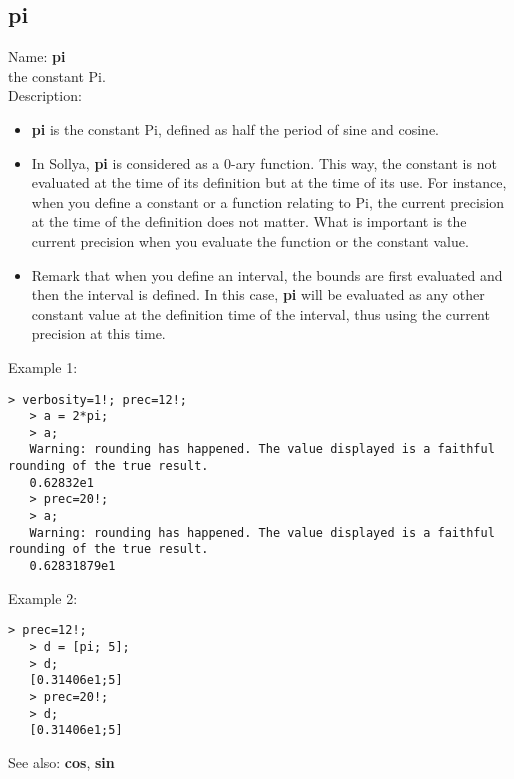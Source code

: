 \subsection{ pi }
\noindent Name: \textbf{pi}\\
the constant Pi.\\

\noindent Description: \begin{itemize}

\item \textbf{pi} is the constant Pi, defined as half the period of sine and cosine.

\item In Sollya, \textbf{pi} is considered as a 0-ary function. This way, the constant 
   is not evaluated at the time of its definition but at the time of its use. For 
   instance, when you define a constant or a function relating to Pi, the current
   precision at the time of the definition does not matter. What is important is 
   the current precision when you evaluate the function or the constant value.

\item Remark that when you define an interval, the bounds are first evaluated and 
   then the interval is defined. In this case, \textbf{pi} will be evaluated as any 
   other constant value at the definition time of the interval, thus using the 
   current precision at this time.
\end{itemize}
\noindent Example 1: 
\begin{center}\begin{minipage}{14.8cm}\begin{Verbatim}[frame=single]
   > verbosity=1!; prec=12!;
   > a = 2*pi;
   > a;
   Warning: rounding has happened. The value displayed is a faithful rounding of the true result.
   0.62832e1
   > prec=20!;
   > a;
   Warning: rounding has happened. The value displayed is a faithful rounding of the true result.
   0.62831879e1
\end{Verbatim}
\end{minipage}\end{center}
\noindent Example 2: 
\begin{center}\begin{minipage}{14.8cm}\begin{Verbatim}[frame=single]
   > prec=12!;
   > d = [pi; 5];
   > d;
   [0.31406e1;5]
   > prec=20!;
   > d;
   [0.31406e1;5]
\end{Verbatim}
\end{minipage}\end{center}
See also: \textbf{cos}, \textbf{sin}
